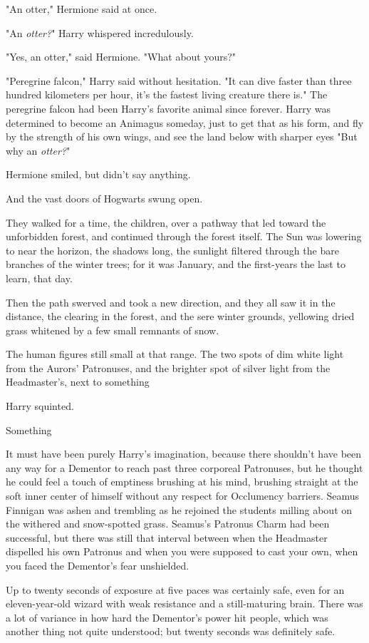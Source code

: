 "An otter," Hermione said at once.

"An \emph{otter?}" Harry whispered incredulously.

"Yes, an otter," said Hermione. "What about yours?"

"Peregrine falcon," Harry said without hesitation. "It can dive faster than
three hundred kilometers per hour, it's the fastest living creature there is."
The peregrine falcon had been Harry's favorite animal since forever. Harry was
determined to become an Animagus someday, just to get that as his form, and fly
by the strength of his own wings, and see the land below with sharper
eyes{\el} "But why an \emph{otter?}"

Hermione smiled, but didn't say anything.

And the vast doors of Hogwarts swung open.

They walked for a time, the children, over a pathway that led toward the
unforbidden forest, and continued through the forest itself. The Sun was
lowering to near the horizon, the shadows long, the sunlight filtered through
the bare branches of the winter trees; for it was January, and the first-years
the last to learn, that day.

Then the path swerved and took a new direction, and they all saw it in the
distance, the clearing in the forest, and the sere winter grounds, yellowing
dried grass whitened by a few small remnants of snow.

The human figures still small at that range. The two spots of dim white light
from the Aurors' Patronuses, and the brighter spot of silver light from the
Headmaster's, next to something{\el}

Harry squinted.

Something{\el}

It must have been purely Harry's imagination, because there shouldn't have been
any way for a Dementor to reach past three corporeal Patronuses, but he thought
he could feel a touch of emptiness brushing at his mind, brushing straight at
the soft inner center of himself without any respect for Occlumency barriers.
\sbreak
Seamus Finnigan was ashen and trembling as he rejoined the students milling
about on the withered and snow-spotted grass. Seamus's Patronus Charm had been
successful, but there was still that interval between when the Headmaster
dispelled his own Patronus and when you were supposed to cast your own, when
you faced the Dementor's fear unshielded.

Up to twenty seconds of exposure at five paces was certainly safe, even for an
eleven-year-old wizard with weak resistance and a still-maturing brain. There
was a lot of variance in how hard the Dementor's power hit people, which was
another thing not quite understood; but twenty seconds was definitely safe.

